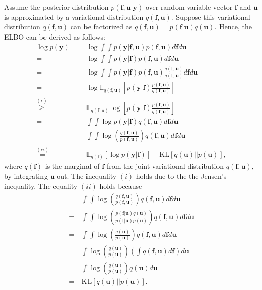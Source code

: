 \documentclass[journal]{IEEEtran}
\begin{document}
Assume the posterior distribution  $p(\mathbf{f}, \mathbf{u}|\mathbf{y})$ over random variable vector $\mathbf{f}$ and $\mathbf{u}$ is approximated by a variational distribution $q(\mathbf{f}, \mathbf{u})$. 
Suppose this variational distribution $q(\mathbf{f}, \mathbf{u})$ can be factorized as $q(\mathbf{f}, \mathbf{u}) = p(\mathbf{f} | \mathbf{u}) q(\mathbf{u})$. Hence, the ELBO can be derived as follows:
\begingroup
\allowdisplaybreaks
\begin{align*}
    \log p(\mathbf{y})
    =&~ \log \int \int p(\mathbf{y}|\mathbf{f}, \mathbf{u}) p(\mathbf{f}, \mathbf{u}) d \mathbf{f} d \mathbf{u}\\
    =&~ \log \int \int p(\mathbf{y}|\mathbf{f}) p(\mathbf{f}, \mathbf{u}) d \mathbf{f} d \mathbf{u}\\
    =&~ \log \int \int p(\mathbf{y}|\mathbf{f}) p(\mathbf{f}, \mathbf{u}) \frac{q(\mathbf{f}, \mathbf{u})}{q(\mathbf{f}, \mathbf{u})} d \mathbf{f} d \mathbf{u}\\
    =&~ \log \mathbb{E}_{q(\mathbf{f}, \mathbf{u})} \left [  p(\mathbf{y}|\mathbf{f}) \frac{p(\mathbf{f}, \mathbf{u})}{q(\mathbf{f}, \mathbf{u})} \right ]\\
    \overset{(i)}{\ge} &~ \mathbb{E}_{q(\mathbf{f}, \mathbf{u})} \log \left [  p(\mathbf{y}|\mathbf{f}) \frac{p(\mathbf{f}, \mathbf{u})}{q(\mathbf{f}, \mathbf{u})} \right ]\\
    =&~ \int \int \log p(\mathbf{y}|\mathbf{f}) q(\mathbf{f}, \mathbf{u}) d \mathbf{f} d \mathbf{u} - \\
    &~\int \int \log \left ( \frac{q(\mathbf{f}, \mathbf{u})}{p(\mathbf{f}, \mathbf{u})} \right ) q(\mathbf{f}, \mathbf{u}) d \mathbf{f} d \mathbf{u}\\
    \overset{(ii)}{=}&~ \mathbb{E}_{q(\mathbf{f})}\left [ \log p(\mathbf{y}|\mathbf{f}) \right ] - \text{KL}\left [ q(\mathbf{u}) || p(\mathbf{u}) \right ],
\end{align*}
\endgroup
where $q(\mathbf{f})$ is the marginal of $\mathbf{f}$ from the joint variational distribution $q(\mathbf{f}, \mathbf{u})$, by integrating $\mathbf{u}$ out. The inequality $(i)$ holds due to the the Jensen's inequality. The equality $(ii)$ holds because
\begingroup
\allowdisplaybreaks
\begin{align*}
&~ \int \int \log \left ( \frac{q(\mathbf{f}, \mathbf{u})}{p(\mathbf{f}, \mathbf{u})} \right ) q(\mathbf{f}, \mathbf{u}) d \mathbf{f} d \mathbf{u}\\
= &~ \int \int \log \left ( \frac{p(\mathbf{f}| \mathbf{u}) q(\mathbf{u})}{p(\mathbf{f} |\mathbf{u}) p(\mathbf{u})} \right ) q(\mathbf{f}, \mathbf{u}) d \mathbf{f} d \mathbf{u}\\
= &~ \int \int \log \left (\frac{q(\mathbf{u})}{p(\mathbf{u})} \right ) q(\mathbf{f}, \mathbf{u}) d \mathbf{f} d \mathbf{u}\\
= &~ \int \log \left (\frac{q(\mathbf{u})}{p(\mathbf{u})} \right ) \left ( \int q(\mathbf{f}, \mathbf{u}) d \mathbf{f} \right) d \mathbf{u}\\
= &~ \int \log \left (\frac{q(\mathbf{u})}{p(\mathbf{u})} \right ) q(\mathbf{u}) d \mathbf{u}\\
= &~ \text{KL}\left [ q(\mathbf{u}) || p(\mathbf{u}) \right ].
\end{align*}
\endgroup
\end{document}
